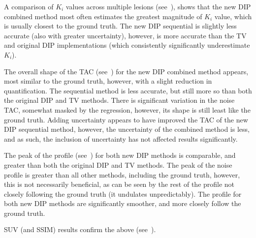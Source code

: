         A comparison of $K_i$ values across multiple lesions (see~), shows that the new \gls{DIP} combined method most often estimates the greatest magnitude of $K_i$ value, which is usually closest to the ground truth. The new \gls{DIP} sequential is slightly less accurate (also with greater uncertainty), however, is more accurate than the \gls{TV} and original \gls{DIP} implementations (which consistently significantly underestimate $K_i$).
        
        The overall shape of the \gls{TAC} (see~) for the new \gls{DIP} combined method appears, most similar to the ground truth, however, with a slight reduction in quantification. The sequential method is less accurate, but still more so than both the original \gls{DIP} and \gls{TV} methods. There is significant variation in the noise \gls{TAC}, somewhat masked by the regression, however, its shape is still least like the ground truth. Adding uncertainty appears to have improved the \gls{TAC} of the new \gls{DIP} sequential method, however, the uncertainty of the combined method is less, and as such, the inclusion of uncertainty has not affected results significantly.
        
        The peak of the profile (see~) for both new \gls{DIP} methods is comparable, and greater than both the original \gls{DIP} and \gls{TV} methods. The peak of the noise profile is greater than all other methods, including the ground truth, however, this is not necessarily beneficial, as can be seen by the rest of the profile not closely following the ground truth (it undulates unpredictably). The profile for both new \gls{DIP} methods are significantly smoother, and more closely follow the ground truth.
         
        \gls{SUV} (and \gls{SSIM}) results confirm the above (see~).
    
    
